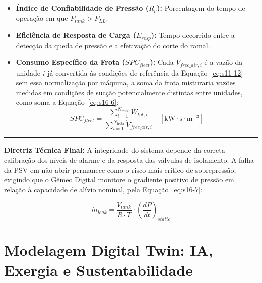 \documentclass[12pt,a4paper]{article}
\numberwithin{equation}{section}
\numberwithin{table}{section}
\numberwithin{figure}{section}
\begin{document}
\begin{itemize}
	\item \textbf{Índice de Confiabilidade de Pressão ($R_p$):} Porcentagem do tempo de operação em que $P_{tank} > P_{LL}$.
	\item \textbf{Eficiência de Resposta de Carga ($E_{resp}$):} Tempo decorrido entre a detecção da queda de pressão e a efetivação do corte do ramal.
	\item \textbf{Consumo Específico da Frota ($SPC_{fleet}$):} Cada $\dot{V}_{free\_air,i}$ é a vazão da unidade $i$ já convertida às condições de referência da Equação~\eqref{eq:s11-12} — sem essa normalização por máquina, a soma da frota misturaria vazões medidas em condições de sucção potencialmente distintas entre unidades, como soma a Equação~\eqref{eq:s16-6}:
	\begin{equation}\label{eq:s16-6}
SPC_{fleet} = \frac{\sum_{i=1}^{N_{\text{frota}}} \dot{W}_{tot,i}}{\sum_{i=1}^{N_{\text{frota}}} \dot{V}_{free\_air,i}} \quad [\text{kW} \cdotp \text{s} \cdotp \text{m}^{-3}]
\end{equation}
\end{itemize}

\vspace{1em}
\hrule
\vspace{1em}

\textbf{Diretriz Técnica Final:} A integridade do sistema depende da correta calibração dos níveis de alarme e da resposta das válvulas de isolamento. A falha da PSV em não abrir permanece como o risco mais crítico de sobrepressão, exigindo que o Gêmeo Digital monitore o gradiente positivo de pressão em relação à capacidade de alívio nominal, pela Equação~\eqref{eq:s16-7}:

\begin{equation}\label{eq:s16-7}
\boxed{\dot{m}_{leak} = \frac{V_{tank}}{R \cdotp T} \cdotp \left( \frac{dP}{dt} \right)_{static}}
\end{equation}



\clearpage
\section{Modelagem Digital Twin: IA, Exergia e Sustentabilidade}

\end{document}
